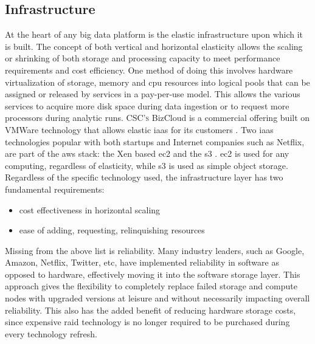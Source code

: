 \subsection{Infrastructure}
At the heart of any big data platform is the elastic infrastructure upon which it is built. The concept of both vertical and horizontal elasticity allows the scaling or shrinking of both storage and processing capacity to meet performance requirements and cost efficiency. One method of doing this involves hardware virtualization  of storage, memory and cpu resources into logical pools that can be assigned or released by services in a pay-per-use model. This allows the various services to acquire more disk space during data ingestion or to request more processors during analytic runs. \textsc{CSC's} BizCloud is a commercial offering built on VMWare  technology that allows elastic \gls{iaas} for its customers \cite{bizcloud}. Two \gls{iaas} technologies popular with both startups and Internet companies such as Netflix, are part of the \gls{aws} stack: the Xen based \gls{ec2} and the \gls{s3} \cite{cockcroft}. \gls{ec2} is used for any computing, regardless of elasticity, while \gls{s3} is used as simple object storage. Regardless of the specific technology used, the infrastructure layer has two fundamental requirements:
\begin{itemize}
    \item cost effectiveness in horizontal scaling
    \item ease of adding, requesting, relinquishing resources
\end{itemize}
Missing from the above list is reliability. Many industry leaders, such as Google, Amazon, Netflix, Twitter, etc, have implemented reliability in software as opposed to hardware, effectively moving it into the software storage layer. This approach gives the flexibility to completely replace failed storage and compute nodes with upgraded versions at leisure and without necessarily impacting overall reliability. This also has the added benefit of  reducing hardware storage costs, since expensive \gls{raid} technology is no longer required to be purchased during every technology refresh.\\

